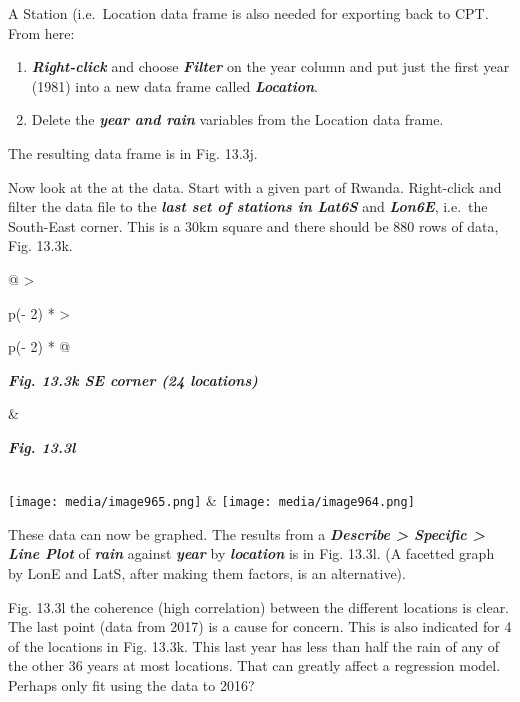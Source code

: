 \documentclass[
  letterpaper,
  DIV=11,
  numbers=noendperiod]{scrreprt}
\begin{document}
A Station (i.e.~Location data frame is also needed for exporting back to
CPT. From here:

\begin{enumerate}
\def\labelenumi{\alph{enumi})}
\item
  \textbf{\emph{Right-click}} and choose \textbf{\emph{Filter}} on the
  year column and put just the first year (1981) into a new data frame
  called \textbf{\emph{Location}}.
\item
  Delete the \textbf{\emph{year and rain}} variables from the Location
  data frame.
\end{enumerate}

The resulting data frame is in Fig. 13.3j.

Now look at the at the data. Start with a given part of Rwanda.
Right-click and filter the data file to the \textbf{\emph{last set of
stations in Lat6S}} and \textbf{\emph{Lon6E}}, i.e.~the South-East
corner. This is a 30km square and there should be 880 rows of data, Fig.
13.3k.

\begin{longtable}[]{@{}
  >{\raggedright\arraybackslash}p{(\columnwidth - 2\tabcolsep) * }
  >{\raggedright\arraybackslash}p{(\columnwidth - 2\tabcolsep) * }@{}}
\toprule\noalign{}
\begin{minipage}[b]{\linewidth}\raggedright
\textbf{\emph{Fig. 13.3k SE corner (24 locations)}}
\end{minipage} & \begin{minipage}[b]{\linewidth}\raggedright
\textbf{\emph{Fig. 13.3l}}
\end{minipage} \\
\midrule\noalign{}
\endhead
\bottomrule\noalign{}
\endlastfoot
\texttt{[image: media/image965.png]} &
\texttt{[image: media/image964.png]} \\
\end{longtable}

These data can now be graphed. The results from a \textbf{\emph{Describe
\textgreater{} Specific \textgreater{} Line Plot}} of
\textbf{\emph{rain}} against \textbf{\emph{year}} by
\textbf{\emph{location}} is in Fig. 13.3l. (A facetted graph by LonE and
LatS, after making them factors, is an alternative).

Fig. 13.3l the coherence (high correlation) between the different
locations is clear. The last point (data from 2017) is a cause for
concern. This is also indicated for 4 of the locations in Fig. 13.3k.
This last year has less than half the rain of any of the other 36 years
at most locations. That can greatly affect a regression model. Perhaps
only fit using the data to 2016?
\end{document}
